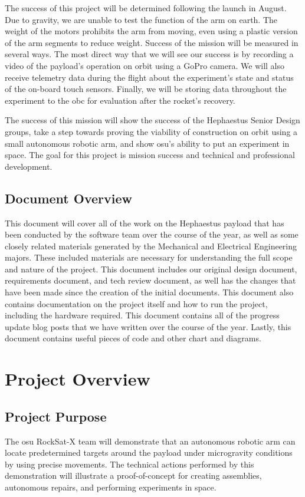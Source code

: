 \documentclass[letterpaper,10pt]{article}
\begin{document}
The success of this project will be determined following the launch in August.
Due to gravity, we are unable to test the function of the arm on earth.
The weight of the motors prohibits the arm from moving, even using a plastic 
version of the arm segments to reduce weight. 
Success of the mission will be measured in several ways.
The most direct way that we will see our success is by recording a video of the 
\gls{payload}'s operation on orbit using a GoPro camera. 
We will also receive telemetry data during the flight about the experiment's 
state and status of the on-board touch sensors. 
Finally, we will be storing data throughout the experiment to the \gls{obc} for
evaluation after the rocket's recovery.

The success of this mission will show the success of the Hephaestus Senior 
Design groups, take a step towards proving the viability of construction
on orbit using a small autonomous robotic arm, and show \gls{osu}'s ability to
put an experiment in space. 
The goal for this project is mission success and technical and professional 
development.

\subsection{Document Overview}
This document will cover all of the work on the Hephaestus payload that has been conducted by the software team over the course of the year, as well as some closely related materials generated by the Mechanical and Electrical Engineering  majors. These included materials are necessary for understanding the full scope and nature of the project. This document includes our original design document, requirements document, and tech review document, as well has the changes that have been made since the creation of the initial documents. This document also contains documentation on the project itself and how to run the project, including the hardware required. This document contains all of the progress update blog posts that we have written over the course of the year. Lastly, this document contains useful pieces of code and other chart and diagrams.

\section{Project Overview}
\subsection{Project Purpose}
The \gls{osu} RockSat-X team will demonstrate that an autonomous robotic arm 
can locate predetermined targets around the \gls{payload} under 
\gls{microgravity} conditions by using precise movements.
The technical actions performed by this demonstration will illustrate a 
proof-of-concept for creating assemblies, autonomous repairs, and performing 
experiments in space.
\end{document}
